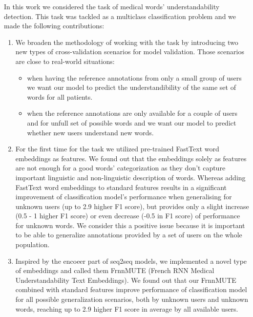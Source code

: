 In this work we considered the task of medical words' understandability detection. This task was tackled as a multiclass classification problem and we made the following contributions:

\begin{enumerate}
    \item We broaden the methodology of working with the task by introducing two new types of cross-validation scenarios for model validation. Those scenarios are close to real-world situations:
    \begin{itemize}
        \item when having the reference annotations from only a small group of users we want our model to predict the understandibility of the same set of words for all patients. 
        \item when the reference annotations are only available for a couple of users and for unfull set of possible words and we want our model to predict whether new users understand new words.
    \end{itemize}
    
    \item For the first time for the task we utilized pre-trained FastText word embeddings as features. We found out that the embeddings solely as features are not enough for a good words' categorization as they don't capture important linguistic and non-linguistic description of words. Whereas adding FastText word embeddings to standard features results in a significant improvement of classification model's performance when generalising for unknown users (up to 2.9 higher F1 score), but provides only a slight increase (0.5 - 1 higher F1 score) or even decrease (-0.5 in F1 score) of performance for unknown words. We consider this a positive issue because it is important to be able to generalize annotations provided by a set of users on the whole population.
    
    \item Inspired by the encoeer part of seq2seq models, we implemented a novel type of embeddings and called them FrnnMUTE (French RNN Medical Understandability Text Embeddings). We found out that our FrnnMUTE combined with standard features improve performance of classification model for all possible generalization scenarios, both by unknown users and unknown words, reaching up to 2.9 higher F1 score in average by all available users.
\end{enumerate}




